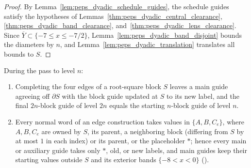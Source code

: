 \begin{proof}\leanok
    By Lemma~\ref{lem:peps_dyadic_schedule_guides}, the schedule guides satisfy the
    hypotheses of Lemmas~\ref{thm:peps_dyadic_central_clearance},
    \ref{thm:peps_dyadic_band_clearance}, and~\ref{thm:peps_dyadic_lens_clearance}.
    Since $\overline Y\subset\{-7\le x\le-7/2\}$,
    Lemma~\ref{lem:peps_dyadic_band_disjoint} bounds the diameters by $n$, and
    Lemma~\ref{lem:peps_dyadic_translation} translates all bounds to $S$.
\end{proof}

\begin{lemma}
    \label{lem:peps_dyadic_active_labels}
    \leanok
    During the pass to level $n$:
    \begin{enumerate}
        \item Completing the four edges of a root-square block $S$ leaves a main
              guide agreeing off $\partial S$ with the block guide updated at $S$
              to its new label, and the final $2n$-block guide of level $2n$ equals
              the starting $n$-block guide of level $n$.
        \item Every normal word of an edge construction takes values in
              $\{A,B,C_e\}$, where $A,B,C_e$ are owned by $S$, its parent, a
              neighboring block (differing from $S$ by at most $1$ in each index)
              or its parent, or the placeholder $\ast$; hence every main or
              auxiliary guide takes only $\ast$, old, or new labels, and main
              guides keep their starting values outside $S$ and its exterior bands
              $\{-8<x<0\}$ (\cite[Section~7, lines 597--618]{OpenAI2026PolynomialPEPS}).
    \end{enumerate}
\end{lemma}


